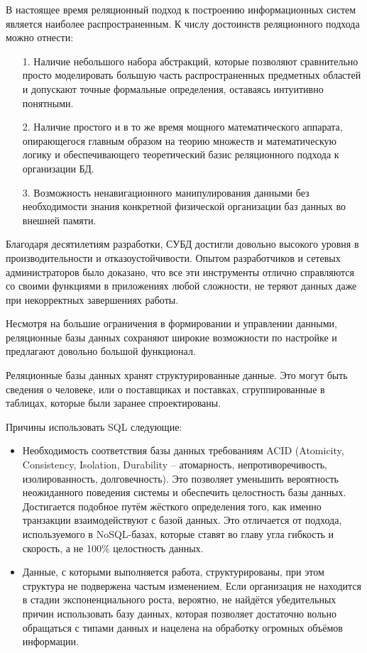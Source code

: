 В настоящее время реляционный подход к построению информационных систем является наиболее распространенным. К числу достоинств реляционного подхода можно отнести:

\begin{itemize}
\item[1.] Наличие небольшого набора абстракций, которые позволяют сравнительно просто моделировать большую часть распространенных предметных областей и допускают точные формальные определения, оставаясь интуитивно понятными.
\item[2.] Наличие простого и в то же время мощного математического аппарата, опирающегося главным образом на теорию множеств и математическую логику и обеспечивающего теоретический базис реляционного подхода к организации БД.
\item[3.] Возможность ненавигационного манипулирования данными без необходимости знания конкретной физической организации баз данных во внешней памяти.
\end{itemize}

Благодаря десятилетиям разработки, СУБД достигли довольно высокого уровня в производительности и отказоустойчивости. Опытом разработчиков и сетевых администраторов было доказано, что все эти инструменты отлично справляются со своими функциями в приложениях любой сложности, не теряют данных даже при некорректных завершениях работы.

Несмотря на большие ограничения в формировании и управлении данными, реляционные базы данных сохраняют широкие возможности по настройке и предлагают довольно большой функционал.

Реляционные базы данных хранят структурированные данные. Это могут быть сведения о человеке, или о поставщиках и поставках, сгруппированные в таблицах, которые были заранее спроектированы.

Причины использовать SQL следующие:
\begin{itemize}
	\item Необходимость соответствия базы данных требованиям ACID (Atomicity, Consistency, Isolation, Durability -- атомарность, непротиворечивость, изолированность, долговечность). Это позволяет уменьшить вероятность неожиданного поведения системы и обеспечить целостность базы данных. Достигается подобное путём жёсткого определения того, как именно транзакции взаимодействуют с базой данных. Это отличается от подхода, используемого в NoSQL-базах, которые ставят во главу угла гибкость и скорость, а не 100\% целостность данных.
	
	\item Данные, с которыми выполняется работа, структурированы, при этом структура не подвержена частым изменением. Если организация не находится в стадии экспоненциального роста, вероятно, не найдётся убедительных причин использовать базу данных, которая позволяет достаточно вольно обращаться с типами данных и нацелена на обработку огромных объёмов информации.
\end{itemize}


